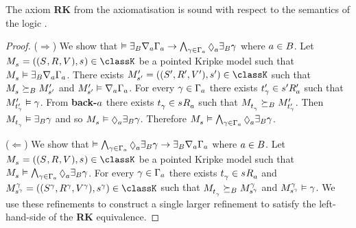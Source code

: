 \begin{lemma}\label{rml-k-rk}
The axiom {\bf RK} from the axiomatisation \axiomRmlK{} is sound with respect to the semantics of the logic \logicRmlK{}.
\end{lemma}

\begin{proof}
($\Rightarrow$) 
We show that $\entails \somerefsBs \coversA \Gamma_\agentA \implies \bigwedge_{\gamma \in \Gamma_\agentA} \possibleA \somerefsBs \gamma$ where $\agentA \in \agentsB$.
Let $\kPModelAndTuple{\kStateS} \in \classK$ be a pointed Kripke model such that $\kPModel{\kStateS} \entails \somerefsBs \coversA \Gamma_\agentA$.
There exists $\kPModelAndTupleP{\kStateSP} \in \classK$ such that $\kPModel{\kStateS} \simulatesBs \kPModelP{\kStateSP}$ and $\kPModelP{\kStateSP} \entails \coversA \Gamma_\agentA$.
For every $\gamma \in \Gamma_\agentA$ there exists $\kStateTP_\gamma \in \kSuccessorsPA{\kStateSP}$ such that $\kPModelP{\kStateTP_\gamma} \entails \gamma$.
From {\bf back-$\agentA$} there exists $\kStateT_\gamma \in \kSuccessorsA{\kStateS}$ such that $\kPModel{\kStateT_\gamma} \simulatesBs \kPModelP{\kStateTP_\gamma}$.
Then $\kPModel{\kStateT_\gamma} \entails \somerefsBs \gamma$ and so $\kPModel{\kStateS} \entails \possibleA \somerefsBs \gamma$.
Therefore $\kPModel{\kStateS} \entails \bigwedge_{\gamma \in \Gamma_\agentA} \possibleA \somerefsBs \gamma$.

($\Leftarrow$) 
We show that $\entails \bigwedge_{\gamma \in \Gamma_\agentA} \possibleA \somerefsBs \gamma \implies \somerefsBs \coversA \Gamma_\agentA$ where $\agentA \in \agentsB$.
Let $\kPModelAndTuple{\kStateS} \in \classK$ be a pointed Kripke model such that $\kPModel{\kStateS} \entails \bigwedge_{\gamma \in \Gamma_\agentA} \possibleA \somerefsBs \gamma$.
For every $\gamma \in \Gamma_\agentA$ there exists $\kStateT_\gamma \in \kSuccessorsA{\kStateS}$ and $\kPModelAndTuple[\gamma]{\kStateS[\gamma]} \in \classK$ such that $\kPModel{\kStateT_\gamma} \simulatesBs \kPModel[\gamma]{\kStateS[\gamma]}$ and $\kPModel[\gamma]{\kStateS[\gamma]} \entails \gamma$.
We use these refinements to construct a single larger refinement to satisfy the left-hand-side of the {\bf RK} equivalence.


\end{proof}
